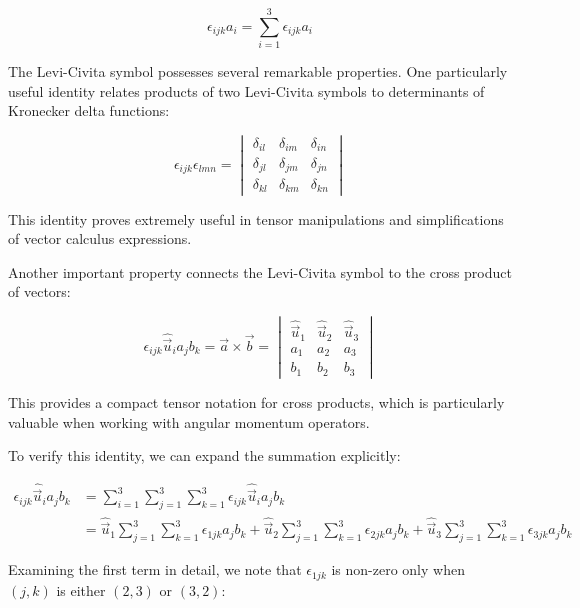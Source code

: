 \documentclass[10pt]{article}
\begin{document}
\begin{equation*}
\epsilon_{i j k} a_{i}=\sum_{i=1}^3 \epsilon_{i j k} a_{i} \tag{1.44}
\end{equation*}

The Levi-Civita symbol possesses several remarkable properties. One particularly useful identity relates products of two Levi-Civita symbols to determinants of Kronecker delta functions:

\[
\epsilon_{i j k} \epsilon_{l m n}=\begin{vmatrix}
\delta_{i l} & \delta_{i m} & \delta_{i n} \tag{1.45}\\
\delta_{j l} & \delta_{j m} & \delta_{j n} \\
\delta_{k l} & \delta_{k m} & \delta_{k n}
\end{vmatrix}
\]

This identity proves extremely useful in tensor manipulations and simplifications of vector calculus expressions.

Another important property connects the Levi-Civita symbol to the cross product of vectors:

\[
\epsilon_{i j k} \hat{\vec{u}}_{i} a_{j} b_{k}=\vec{a} \times \vec{b}=\begin{vmatrix}
\hat{\vec{u}}_{1} & \hat{\vec{u}}_{2} & \hat{\vec{u}}_{3} \tag{1.46}\\
a_{1} & a_{2} & a_{3} \\
b_{1} & b_{2} & b_{3}
\end{vmatrix}
\]

This provides a compact tensor notation for cross products, which is particularly valuable when working with angular momentum operators.

To verify this identity, we can expand the summation explicitly:


\begin{align*}
\epsilon_{i j k} \hat{\vec{u}}_{i} a_{j} b_{k} &= \sum_{i=1}^{3} \sum_{j=1}^{3} \sum_{k=1}^{3} \epsilon_{i j k} \hat{\vec{u}}_{i} a_{j} b_{k} \\
&= \hat{\vec{u}}_{1} \sum_{j=1}^{3} \sum_{k=1}^{3} \epsilon_{1 j k} a_{j} b_{k} + \hat{\vec{u}}_{2} \sum_{j=1}^{3} \sum_{k=1}^{3} \epsilon_{2 j k} a_{j} b_{k} + \hat{\vec{u}}_{3} \sum_{j=1}^{3} \sum_{k=1}^{3} \epsilon_{3 j k} a_{j} b_{k} \tag{1.47}
\end{align*}

Examining the first term in detail, we note that $\epsilon_{1jk}$ is non-zero only when $(j,k)$ is either $(2,3)$ or $(3,2)$:
\end{document}
